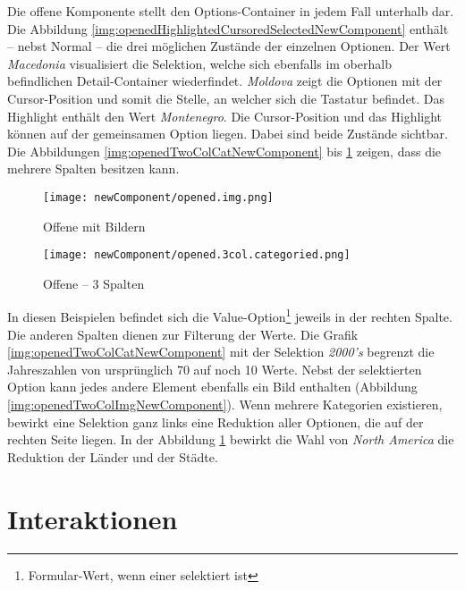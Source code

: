 Die offene Komponente stellt den Options-Container in jedem Fall unterhalb dar. 
Die Abbildung \ref{img:openedHighlightedCursoredSelectedNewComponent} enthält – nebst Normal – die drei möglichen Zustände der einzelnen Optionen. 
Der Wert \emph{Macedonia} visualisiert die Selektion, welche sich ebenfalls im oberhalb befindlichen Detail-Container wiederfindet. 
\emph{Moldova} zeigt die Optionen mit der Cursor-Position und somit die Stelle, an welcher sich die Tastatur befindet. 
Das Highlight enthält den Wert \emph{Montenegro}. 
Die Cursor-Position und das Highlight können auf der gemeinsamen Option liegen. 
Dabei sind beide Zustände sichtbar. 
Die Abbildungen \ref{img:openedTwoColCatNewComponent} bis \ref{img:openedThreeColCatNewComponent} zeigen, dass die  mehrere Spalten besitzen kann. 

\begin{figure}[!htb]
    \begin{minipage}[b]{0.43\textwidth}
        \centering
        \texttt{[image: newComponent/opened.img.png]}
        \caption{\centering Offene  mit Bildern}
        \label{img:openedTwoColImgNewComponent}
    \end{minipage}
    \hfill
    \begin{minipage}[b]{0.47\textwidth}
        \centering
        \texttt{[image: newComponent/opened.3col.categoried.png]}
        \caption{\centering Offene  – 3 Spalten}
        \label{img:openedThreeColCatNewComponent}
    \end{minipage}
\end{figure}

In diesen Beispielen befindet sich die Value-Option\footnote{
    Formular-Wert, wenn einer selektiert ist
} jeweils in der rechten Spalte. 
Die anderen Spalten dienen zur Filterung der Werte. 
Die Grafik \ref{img:openedTwoColCatNewComponent} mit der Selektion \emph{2000's} begrenzt die Jahreszahlen von ursprünglich 70 auf noch 10 Werte. 
Nebst der selektierten Option kann jedes andere Element ebenfalls ein Bild enthalten (Abbildung \ref{img:openedTwoColImgNewComponent}). 
Wenn mehrere Kategorien existieren, bewirkt eine Selektion ganz links eine Reduktion aller Optionen, die auf der rechten Seite liegen. 
In der Abbildung \ref{img:openedThreeColCatNewComponent} bewirkt die Wahl von \emph{North America} die Reduktion der Länder und der Städte. 


\section{Interaktionen}
\label{sec:interaction}

